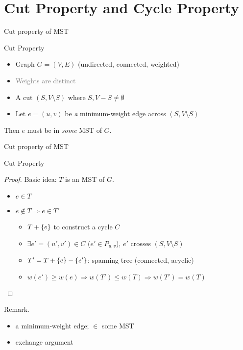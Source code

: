 \section{Cut Property and Cycle Property}

\begin{frame}{Cut property of MST}
  \begin{exampleblock}{Cut Property }
    \begin{itemize}
	  \item Graph $G = (V, E)$ (undirected, connected, weighted)
	  \item \textcolor{gray}{Weights are distinct}
	  \item A cut $(S, V \setminus S)$ where $S, V-S \neq \emptyset$
	  \item Let $e = (u,v)$ be \emph{a} minimum-weight edge across $(S, V \setminus S)$
	\end{itemize}
	Then $e$ must be in \emph{some} MST of $G$.
  \end{exampleblock}

\end{frame}
\begin{frame}{Cut property of MST}
  \begin{block}{Cut Property }
    \begin{proof}
      Basic idea: $T$ is an MST of $G$.
      \begin{itemize}
	\item $e \in T$
	\item $e \notin T \Rightarrow e \in T'$
	  \begin{itemize}
	    \item $T + \{e\}$ to construct a cycle $C$
	    \item $\exists e' = (u',v') \in C$ ($e' \in P_{u,v}$), $e'$ crosses $(S, V \setminus S)$
	    \item $T' = T + \{e\} - \{e'\}$: spanning tree (connected, acyclic)
	    \item $w(e') \geq w(e) \Rightarrow w(T') \le w(T) \Rightarrow w(T') = w(T)$
	  \end{itemize}
      \end{itemize}
    \end{proof}
  \end{block}

  \begin{alertblock}{Remark.}
    \begin{itemize}
      \item a minimum-weight edge; $\in$ some MST
      \item exchange argument
    \end{itemize}
  \end{alertblock}
\end{frame}
